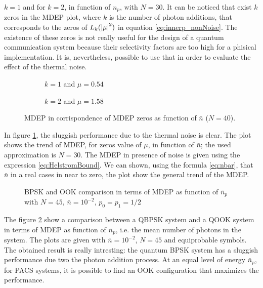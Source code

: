     $k=1$ and for $k=2$, in function of $n_p$, with $N=30$. It can be noticed that exist $k$ zeros
    in the MDEP plot, where $k$ is the number of photon additions, that corresponds to the zeros
    of $L_k(\absolutevalue{\mu}^2)$ in equation \ref{eq:innerp_nonNoise}.
    The existence of these zeros is not really useful for the design of a quantum communication
    system because their selectivity factors are too high for a phisical implementation. It is, 
    nevertheless, possible to use that in order to evaluate the effect of the thermal noise.
    \begin{figure}[t]
        \begin{subfigure}{0.5\textwidth}
            
            \caption{$k=1$ and $\mu = 0.54$}
        \end{subfigure}
        \begin{subfigure}{0.5\textwidth}
            
            \caption{$k=2$ and $\mu = 1.58$}
        \end{subfigure}
        \caption{MDEP in corrispondence of MDEP zeros as function of $\bar{n}$ ($N=40$).}
        \label{fig:3.3}
    \end{figure}
    In figure \ref{fig:3.3}, the sluggish performance due to the thermal noise is clear. The plot
    shows the trend of MDEP, for zeros value of $\mu$, in function of $\bar{n}$; the used approximation
    is $N=30$. The MDEP in presence of noise is given using the expression \ref{eq:HelstromBound}.
    We can shown, using the formula \ref{eq:nbar}, that $\bar{n}$ in a real cases in near to zero, the 
    plot show the general trend of the MDEP.

    \begin{figure}[t]
        \begin{center}
            
            \caption{BPSK and OOK comparison in terms of MDEP as function of $\bar{n}_p$ with $N=45$, $\bar{n}=10^{-2}$, $p_0=p_1=1/2$}
            \label{fig:3.4}
        \end{center}
    \end{figure}
    
    The figure \ref{fig:3.4} show a comparison between a QBPSK system and a QOOK system in terms of 
    MDEP as function of $\bar{n}_p$, i.e. the mean number of photons in the system. 
    The plots are given with $\bar{n}= 10^{-2}$, $N=45$ and equiprobable symbols.
    The obtained result is really intresting: the quantum BPSK system has a sluggish performance due two 
    the photon addition process. At an equal level of energy $\bar{n}_p$, for PACS systems, it is
    possible to find an OOK configuration that maximizes the performance.
    